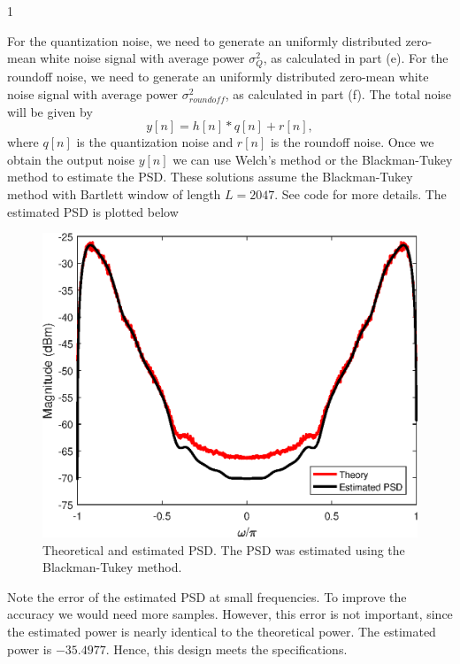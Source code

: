 \documentclass[10pt]{article}
\def\SOLUTIONS{1} %
\def\SolutionsColor{red2}
\begin{document}
\begin{description}
	\if\SOLUTIONS1 {\color{\SolutionsColor}
		For the quantization noise, we need to generate an uniformly distributed zero-mean white noise signal with average power $\sigma_Q^2$, as calculated in part (e). For the roundoff noise, we need to generate an uniformly distributed zero-mean white noise signal with average power $\sigma_{roundoff}^2$, as calculated in part (f). The total noise will be given by
		\begin{equation}
			y[n] = h[n]\ast q[n] + r[n],
		\end{equation}
		where $q[n]$ is the quantization noise and $r[n]$ is the roundoff noise. Once we obtain the output noise $y[n]$ we can use Welch's method or the Blackman-Tukey method to estimate the PSD. These solutions assume the Blackman-Tukey method with Bartlett window of length $L = 2047$. See code for more details. The estimated PSD is plotted below
		
		\FloatBarrier
		\begin{figure}[h!]
			\centering
			\includegraphics[scale=0.6]{figs/hearing_aid_psd.eps}
			\caption{Theoretical and estimated PSD. The PSD was estimated using the Blackman-Tukey method.}
		\end{figure}
		\FloatBarrier
		
		Note the error of the estimated PSD at small frequencies. To improve the accuracy we would need more samples. However, this error is not important, since the estimated power is nearly identical to the theoretical power. The estimated power is $-35.4977$. Hence, this design meets the specifications.
	}\fi
		
\end{description}
\end{document}
